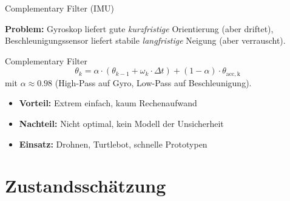 \documentclass[%
  aspectratio=169,
  10pt
]{beamer}
\begin{document}
\begin{frame}{Complementary Filter (IMU)}

\textbf{Problem:} Gyroskop liefert gute \emph{kurzfristige} Orientierung
(aber driftet), Beschleunigungssensor liefert stabile \emph{langfristige}
Neigung (aber verrauscht).

\vspace{3mm}
\begin{block}{Complementary Filter}
  \[
    \theta_k = \alpha \cdot (\theta_{k-1} + \omega_k \cdot \Delta t)
             + (1-\alpha) \cdot \theta_\mathrm{acc,k}
  \]
  mit $\alpha \approx 0.98$ (High-Pass auf Gyro, Low-Pass auf Beschleunigung).
\end{block}

\vspace{3mm}
\begin{itemize}
  \item \textbf{Vorteil:} Extrem einfach, kaum Rechenaufwand
  \item \textbf{Nachteil:} Nicht optimal, kein Modell der Unsicherheit
  \item \textbf{Einsatz:} Drohnen, Turtlebot, schnelle Prototypen
\end{itemize}

\end{frame}


\section{Zustandsschätzung}
\end{document}
